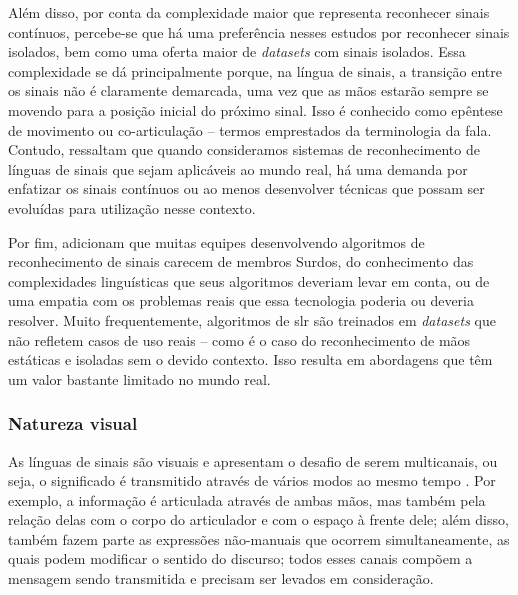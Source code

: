 Além disso, por conta da complexidade maior que representa reconhecer sinais contínuos, percebe-se que há uma preferência nesses estudos por reconhecer sinais isolados, bem como uma oferta maior de \textit{datasets} com sinais isolados. Essa complexidade se dá principalmente porque, na língua de sinais, a transição entre os sinais não é claramente demarcada, uma vez que as mãos estarão sempre se movendo para a posição inicial do próximo sinal. Isso é conhecido como epêntese de movimento ou co-articulação -- termos emprestados da terminologia da fala.
Contudo,  ressaltam que quando consideramos sistemas de reconhecimento de línguas de sinais que sejam aplicáveis ao mundo real, há uma demanda por enfatizar os sinais contínuos ou ao menos desenvolver técnicas que possam ser evoluídas para utilização nesse contexto.

Por fim,  adicionam que muitas equipes desenvolvendo algoritmos de reconhecimento de sinais carecem de membros Surdos, do conhecimento das complexidades linguísticas que seus algoritmos deveriam levar em conta, ou de uma empatia com os problemas reais que essa tecnologia poderia ou deveria resolver. 
Muito frequentemente, algoritmos de \acrshort{slr} são treinados em \textit{datasets} que não refletem casos de uso reais -- como é o caso do reconhecimento de mãos estáticas e isoladas sem o devido contexto. Isso resulta em abordagens que têm um valor bastante limitado no mundo real.








\subsubsection{Natureza visual}
\label{sec:slr-desafios-natureza-visual}

As línguas de sinais são visuais e apresentam o desafio de serem multicanais, ou seja, o significado é transmitido através de vários modos ao mesmo tempo \cite{cooper-2011-slr}. Por exemplo, a informação é articulada através de ambas mãos, mas também pela relação delas com o corpo do articulador e com o espaço à frente dele; além disso, também fazem parte as expressões não-manuais que ocorrem simultaneamente, as quais podem modificar o sentido do discurso; todos esses canais compõem a mensagem sendo transmitida e precisam ser levados em consideração.

